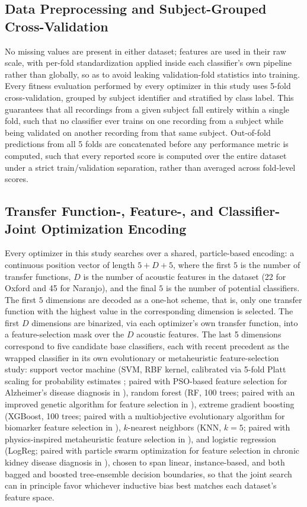 \subsection{Data Preprocessing and Subject-Grouped Cross-Validation} \label{sec:3.2}
No missing values are present in either dataset; features are used in their raw scale, with per-fold standardization applied inside each classifier's own pipeline rather than globally, so as to avoid leaking validation-fold statistics into training. Every fitness evaluation performed by every optimizer in this study uses 5-fold cross-validation, grouped by subject identifier and stratified by class label. This guarantees that all recordings from a given subject fall entirely within a single fold, such that no classifier ever trains on one recording from a subject while being validated on another recording from that same subject. Out-of-fold predictions from all 5 folds are concatenated before any performance metric is computed, such that every reported score is computed over the entire dataset under a strict train/validation separation, rather than averaged across fold-level scores.

\subsection{Transfer Function-, Feature-, and Classifier- Joint Optimization Encoding} \label{sec:3.3}
Every optimizer in this study searches over a shared, particle-based encoding: a continuous position vector of length $5 + D + 5$, where the first $5$ is the number of transfer functions, $D$ is the number of acoustic features in the dataset (22 for Oxford and 45 for Naranjo), and the final $5$ is the number of potential classifiers. The first $5$ dimensions are decoded as a one-hot scheme, that is, only one transfer function with the highest value in the corresponding dimension is selected. The first $D$ dimensions are binarized, via each optimizer's own transfer function, into a feature-selection mask over the $D$ acoustic features. The last 5 dimensions correspond to five candidate base classifiers, each with recent precedent as the wrapped classifier in its own evolutionary or metaheuristic feature-selection study: support vector machine (SVM, RBF kernel, calibrated via 5-fold Platt scaling for probability estimates \cite{Platt:1999}; paired with PSO-based feature selection for Alzheimer's disease diagnosis in \cite{Zhang:2025}), random forest (RF, 100 trees; paired with an improved genetic algorithm for feature selection in \cite{Ding:2025}), extreme gradient boosting (XGBoost, 100 trees; paired with a multiobjective evolutionary algorithm for biomarker feature selection in \cite{Panagiotopoulos:2023}), $k$-nearest neighbors (KNN, $k=5$; paired with physics-inspired metaheuristic feature selection in \cite{Priyadarshini:2023}), and logistic regression (LogReg; paired with particle swarm optimization for feature selection in chronic kidney disease diagnosis in \cite{Mishra:2025}), chosen to span linear, instance-based, and both bagged and boosted tree-ensemble decision boundaries, so that the joint search can in principle favor whichever inductive bias best matches each dataset's feature space.

